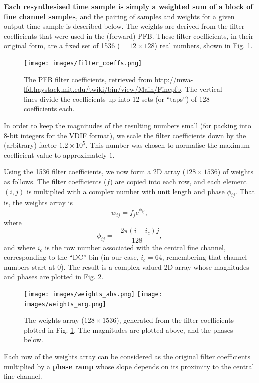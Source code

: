 \documentclass{article}
\begin{document}
{\bf Each resynthesised time sample is simply a weighted sum of a block of fine channel samples}, and the pairing of samples and weights for a given output time sample is described below.
The weights are derived from the filter coefficients that were used in the (forward) PFB.
These filter coefficients, in their original form, are a fixed set of 1536 ($= 12 \times 128$) real numbers, shown in Fig. \ref{fig:filter_coeffs}.
\begin{figure}[!b]
    \centering
    \texttt{[image: images/filter\_coeffs.png]}
    \caption{The PFB filter coefficients, retrieved from \url{http://mwa-lfd.haystack.mit.edu/twiki/bin/view/Main/Finepfb}. The vertical lines divide the coefficients up into 12 sets (or ``taps'') of 128 coefficients each.}
    \label{fig:filter_coeffs}
\end{figure}
In order to keep the magnitudes of the resulting numbers small (for packing into 8-bit integers for the VDIF format), we scale the filter coefficients down by the (arbitrary) factor $1.2 \times 10^{5}$.
This number was chosen to normalise the maximum coefficient value to approximately $1$.

Using the 1536 filter coefficients, we now form a 2D array ($128 \times 1536$) of weights as follows.
The filter coefficients ($f$) are copied into each row, and each element $(i,j)$ is multiplied with a complex number with unit length and phase $\phi_{ij}$.
That is, the weights array is
\begin{equation}
    w_{ij} = f_j e^{\phi_{ij}},
\end{equation}
where
\begin{equation}
    \phi_{ij} = \frac{-2\pi(i-i_c)j}{128},
\end{equation}
and where $i_c$ is the row number associated with the central fine channel, corresponding to the ``DC'' bin (in our case, $i_c = 64$, remembering that channel numbers start at $0$).
The result is a complex-valued 2D array whose magnitudes and phases are plotted in Fig. \ref{fig:weights}.
\begin{figure}[!b]
    \centering
    \texttt{[image: images/weights\_abs.png]}
    \texttt{[image: images/weights\_arg.png]}
    \caption{The weights array ($128 \times 1536$), generated from the filter coefficients plotted in Fig. \ref{fig:filter_coeffs}. The magnitudes are plotted above, and the phases below.}
    \label{fig:weights}
\end{figure}
Each row of the weights array can be considered as the original filter coefficients multiplied by a {\bf phase ramp} whose slope depends on its proximity to the central fine channel.
\end{document}

